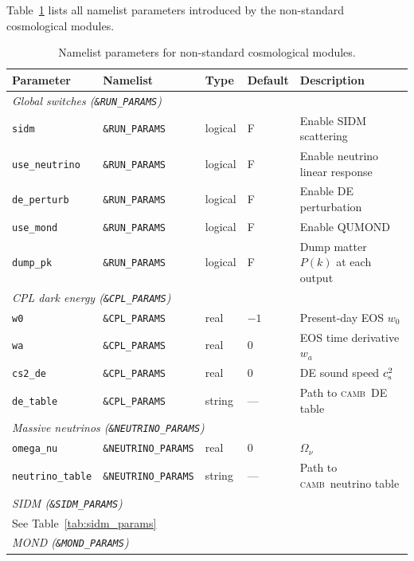 \documentclass[fleqn,usenatbib]{mnras}
\newcommand{\camb}{\textsc{camb}}
\newcommand{\code}[1]{\texttt{#1}}
\newcommand{\Onu}{\Omega_\nu}
\newcommand{\cst}{c_{\rm s}^2}
\begin{document}
Table~\ref{tab:namelist_full} lists all namelist parameters introduced
by the non-standard cosmological modules.

\begin{table}
\centering
\caption{Namelist parameters for non-standard cosmological modules.}
\label{tab:namelist_full}
\small
\begin{tabular}{lllll}
\toprule
Parameter & Namelist & Type & Default & Description \\
\midrule
\multicolumn{5}{l}{\emph{Global switches (\code{\&RUN\_PARAMS})}} \\
\code{sidm}             & \code{\&RUN\_PARAMS}      & logical & F   & Enable SIDM scattering \\
\code{use\_neutrino}    & \code{\&RUN\_PARAMS}      & logical & F   & Enable neutrino linear response \\
\code{de\_perturb}      & \code{\&RUN\_PARAMS}      & logical & F   & Enable DE perturbation \\
\code{use\_mond}        & \code{\&RUN\_PARAMS}      & logical & F   & Enable QUMOND \\
\code{dump\_pk}         & \code{\&RUN\_PARAMS}      & logical & F   & Dump matter $P(k)$ at each output \\
\midrule
\multicolumn{5}{l}{\emph{CPL dark energy (\code{\&CPL\_PARAMS})}} \\
\code{w0}               & \code{\&CPL\_PARAMS}      & real    & $-1$ & Present-day EOS $w_0$ \\
\code{wa}               & \code{\&CPL\_PARAMS}      & real    & 0   & EOS time derivative $w_a$ \\
\code{cs2\_de}          & \code{\&CPL\_PARAMS}      & real    & 0   & DE sound speed $\cst$ \\
\code{de\_table}        & \code{\&CPL\_PARAMS}      & string  & --- & Path to \camb\ DE table \\
\midrule
\multicolumn{5}{l}{\emph{Massive neutrinos (\code{\&NEUTRINO\_PARAMS})}} \\
\code{omega\_nu}        & \code{\&NEUTRINO\_PARAMS} & real    & 0   & $\Onu$ \\
\code{neutrino\_table}  & \code{\&NEUTRINO\_PARAMS} & string  & --- & Path to \camb\ neutrino table \\
\midrule
\multicolumn{5}{l}{\emph{SIDM (\code{\&SIDM\_PARAMS})}} \\
\multicolumn{5}{l}{See Table~\ref{tab:sidm_params}} \\
\midrule
\multicolumn{5}{l}{\emph{MOND (\code{\&MOND\_PARAMS})}} \\

\end{tabular}
\end{table}
\end{document}
